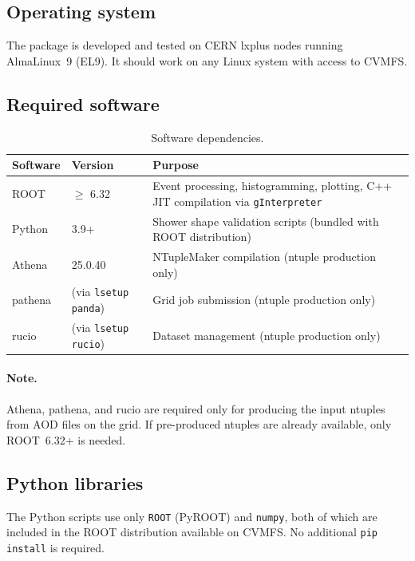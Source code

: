 \documentclass[12pt,a4paper]{article}
\begin{document}
\subsection{Operating system}

The package is developed and tested on CERN lxplus nodes running
AlmaLinux~9 (EL9). It should work on any Linux system with access to
CVMFS.

\subsection{Required software}

\begin{table}[htbp]
\centering
\caption{Software dependencies.}
\label{tab:requirements}
\begin{tabular}{llp{7.5cm}}
\toprule
\textbf{Software} & \textbf{Version} & \textbf{Purpose} \\
\midrule
ROOT & $\geq$ 6.32 & Event processing, histogramming, plotting, C++ JIT
  compilation via \texttt{gInterpreter} \\
Python & 3.9+ & Shower shape validation scripts
  (bundled with ROOT distribution) \\
Athena & 25.0.40 & NTupleMaker compilation (ntuple production only) \\
pathena & (via \texttt{lsetup panda}) & Grid job submission
  (ntuple production only) \\
rucio & (via \texttt{lsetup rucio}) & Dataset management
  (ntuple production only) \\
\bottomrule
\end{tabular}
\end{table}

\paragraph{Note.} Athena, pathena, and rucio are required only for
producing the input ntuples from AOD files on the grid. If pre-produced
ntuples are already available, only ROOT~6.32+ is needed.

\subsection{Python libraries}

The Python scripts use only \texttt{ROOT} (PyROOT) and \texttt{numpy},
both of which are included in the ROOT distribution available on CVMFS.
No additional \texttt{pip install} is required.
\end{document}
